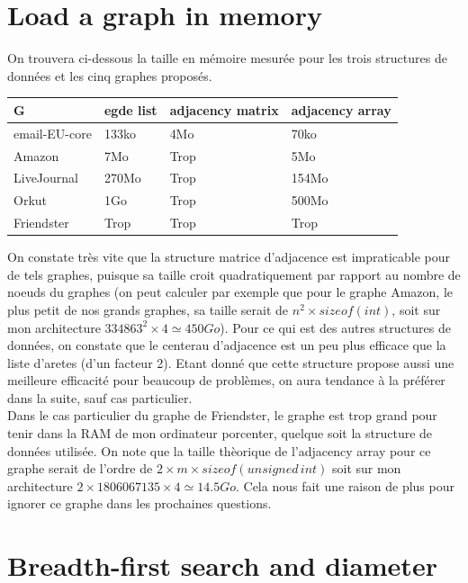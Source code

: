 \documentclass{report}
\begin{document}
\section{Load a graph in memory}
On trouvera ci-dessous la taille en mémoire mesurée pour les trois structures de données et les cinq graphes proposés.

\begin{center}
  \begin{tabular}{|l|l|l|l|}
    \hline
    G & egde list & adjacency matrix & adjacency array \\
    \hline
    email-EU-core & 133ko & 4Mo & 70ko \\
    Amazon & 7Mo & Trop & 5Mo \\
    LiveJournal & 270Mo & Trop & 154Mo \\
    Orkut & 1Go & Trop & 500Mo \\
    Friendster & Trop & Trop & Trop \\
    \hline
  \end{tabular}
\end{center}
On constate très vite que la structure matrice d'adjacence est impraticable pour de tels graphes, puisque sa taille croit quadratiquement par rapport au nombre de noeuds du graphes (on peut calculer par exemple que pour le graphe Amazon, le plus petit de nos grands graphes, sa taille serait de $n^2 \times sizeof(int)$, soit sur mon architecture $334863^2 \times 4 \simeq 450Go$). Pour ce qui est des autres structures de données, on constate que le centerau d'adjacence est un peu plus efficace que la liste d'aretes (d'un facteur 2). Etant donné que cette structure propose aussi une meilleure efficacité pour beaucoup de problèmes, on aura tendance à la préférer dans la suite, sauf cas particulier.\\
Dans le cas particulier du graphe de Friendster, le graphe est trop grand pour tenir dans la RAM de mon ordinateur porcenter, quelque soit la structure de données utilisée. On note que la taille thèorique de l'adjacency array pour ce graphe serait de l'ordre de $2\times m \times sizeof(unsigned\,int)$ soit sur mon architecture $2 \times 1806067135 \times 4 \simeq 14.5Go$. Cela nous fait une raison de plus pour ignorer ce graphe dans les prochaines questions.

\section{Breadth-first search and diameter}
\end{document}
